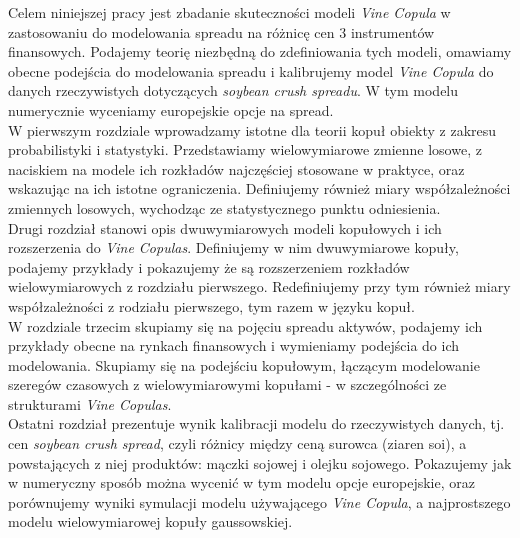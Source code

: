\begin{wstep}[Wprowadzenie]
	Celem niniejszej pracy jest zbadanie skuteczności modeli \emph{Vine Copula} w zastosowaniu do modelowania spreadu na różnicę cen 3 instrumentów finansowych. Podajemy teorię niezbędną do zdefiniowania tych modeli, omawiamy obecne podejścia do modelowania spreadu i kalibrujemy model \emph{Vine Copula} do danych rzeczywistych dotyczących \emph{soybean crush spreadu}. W tym modelu numerycznie wyceniamy europejskie opcje na spread.\\
	
	W pierwszym rozdziale wprowadzamy istotne dla teorii kopuł obiekty z zakresu probabilistyki i statystyki. Przedstawiamy wielowymiarowe zmienne losowe, z naciskiem na modele ich rozkładów najczęściej stosowane w praktyce, oraz wskazując na ich istotne ograniczenia. Definiujemy również miary współzależności zmiennych losowych, wychodząc ze statystycznego punktu odniesienia.\\
	
	Drugi rozdział stanowi opis dwuwymiarowych modeli kopułowych i ich rozszerzenia do \emph{Vine Copulas}. Definiujemy w nim dwuwymiarowe kopuły, podajemy przykłady i pokazujemy że są rozszerzeniem rozkładów wielowymiarowych z rozdziału pierwszego. Redefiniujemy przy tym również miary współzależności z rodziału pierwszego, tym razem w języku kopuł.\\
	
	W rozdziale trzecim skupiamy się na pojęciu spreadu aktywów, podajemy ich przykłady obecne na rynkach finansowych i wymieniamy podejścia do ich modelowania. Skupiamy się na podejściu kopułowym, łączącym modelowanie szeregów czasowych z wielowymiarowymi kopułami - w szczególności ze strukturami \emph{Vine Copulas}.\\
	
	Ostatni rozdział prezentuje wynik kalibracji modelu do rzeczywistych danych, tj. cen \emph{soybean crush spread}, czyli różnicy między ceną surowca (ziaren soi), a powstających z niej produktów: mączki sojowej i olejku sojowego. Pokazujemy jak w numeryczny sposób można wycenić w tym modelu opcje europejskie, oraz porównujemy wyniki symulacji modelu używającego \emph{Vine Copula}, a najprostszego modelu wielowymiarowej kopuły gaussowskiej.
	
\end{wstep}
